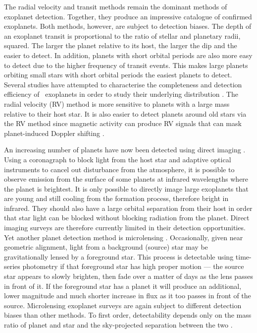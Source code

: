 The radial velocity and transit methods remain the dominant methods of
exoplanet detection.
Together, they produce an impressive catalogue of confirmed exoplanets.
Both methods, however, are subject to detection biases.
The depth of an exoplanet transit is proportional to the ratio of stellar and
planetary radii, squared.
The larger the planet relative to its host, the larger the dip and the easier
to detect.
In addition, planets with short orbital periods are also more easy to detect
due to the higher frequency of transit events.
This makes large planets orbiting small stars with short orbital periods the
easiest planets to detect.
Several studies have attempted to characterise the completeness and detection
efficiency of \kepler\ exoplanets in order to study their underlying
distribution \citep[\eg][]{Petigura2013, Foreman-Mackey2014,
Burke2015, Dressing2015}.
The radial velocity (RV) method is more sensitive to planets with a large mass
relative to their host star.
It is also easier to detect planets around old stars via the RV method since
magnetic activity can produce RV signals that can mask planet-induced Doppler
shifting \citep[\eg][]{Aigrain_2012, Rajpaul2015, Rajpaul2016}.

An increasing number of planets have now been detected using direct imaging
\citep[\eg][]{Kalas2008, Nielsen2013}.
Using a coronagraph to block light from the host star and adaptive optical
instruments to cancel out disturbance from the atmosphere, it is possible to
observe emission from the surface of some planets at infrared wavelengths
where the planet is brightest.
It is only possible to directly image large exoplanets that are young and
still cooling from the formation process, therefore bright in infrared.
They should also have a large orbital separation from their host in order that
star light can be blocked without blocking radiation from the planet.
Direct imaging surveys are therefore currently limited in their detection
opportunities.
Yet another planet detection method is microlensing \citep[\eg][]{Abe2004,
Gould2010, Cassan2012, Gaudi2012}.
Occasionally, given near geometric alignment, light from a background (source)
star may be gravitationally lensed by a foreground star.
This process is detectable using time-series photometry if that foreground
star has high proper motion --- the source star appears to slowly brighten,
then fade over a matter of days as the lens passes in front of it.
If the foreground star has a planet it will produce an additional, lower
magnitude and much shorter increase in flux as it too passes in front of the
source.
Microlensing exoplanet surveys are again subject to different detection
biases than other methods.
To first order, detectability depends only on the mass ratio of planet and
star and the sky-projected separation between the two \citep{Clanton2016}.

